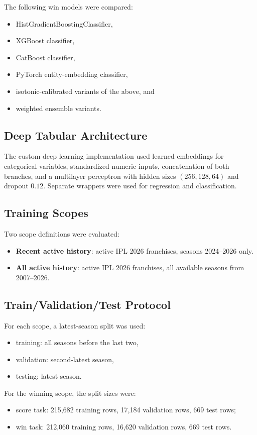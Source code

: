 \documentclass[conference]{IEEEtran}
\begin{document}
The following win models were compared:
\begin{itemize}
\item HistGradientBoostingClassifier,
\item XGBoost classifier,
\item CatBoost classifier,
\item PyTorch entity-embedding classifier,
\item isotonic-calibrated variants of the above, and
\item weighted ensemble variants.
\end{itemize}

\subsection{Deep Tabular Architecture}
The custom deep learning implementation used learned embeddings for categorical variables, standardized numeric inputs, concatenation of both branches, and a multilayer perceptron with hidden sizes $(256, 128, 64)$ and dropout $0.12$. Separate wrappers were used for regression and classification.

\subsection{Training Scopes}
Two scope definitions were evaluated:
\begin{itemize}
\item \textbf{Recent active history}: active IPL 2026 franchises, seasons 2024--2026 only.
\item \textbf{All active history}: active IPL 2026 franchises, all available seasons from 2007--2026.
\end{itemize}

\subsection{Train/Validation/Test Protocol}
For each scope, a latest-season split was used:
\begin{itemize}
\item training: all seasons before the last two,
\item validation: second-latest season,
\item testing: latest season.
\end{itemize}

For the winning scope, the split sizes were:
\begin{itemize}
\item score task: 215,682 training rows, 17,184 validation rows, 669 test rows;
\item win task: 212,060 training rows, 16,620 validation rows, 669 test rows.
\end{itemize}
\end{document}

